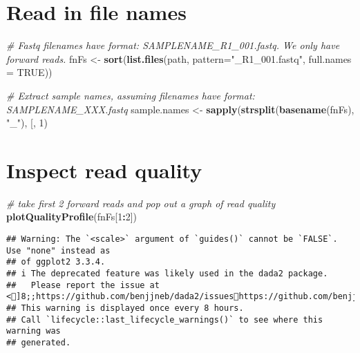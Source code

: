 \documentclass[
]{article}
\newenvironment{Shaded}{\begin{snugshade}}{\end{snugshade}}
\newcommand{\AttributeTok}[1]{\textcolor[rgb]{0.13,0.29,0.53}{#1}}
\newcommand{\CommentTok}[1]{\textcolor[rgb]{0.56,0.35,0.01}{\textit{#1}}}
\newcommand{\ConstantTok}[1]{\textcolor[rgb]{0.56,0.35,0.01}{#1}}
\newcommand{\DecValTok}[1]{\textcolor[rgb]{0.00,0.00,0.81}{#1}}
\newcommand{\FunctionTok}[1]{\textcolor[rgb]{0.13,0.29,0.53}{\textbf{#1}}}
\newcommand{\NormalTok}[1]{#1}
\newcommand{\OtherTok}[1]{\textcolor[rgb]{0.56,0.35,0.01}{#1}}
\newcommand{\SpecialCharTok}[1]{\textcolor[rgb]{0.81,0.36,0.00}{\textbf{#1}}}
\newcommand{\StringTok}[1]{\textcolor[rgb]{0.31,0.60,0.02}{#1}}
\begin{document}
\hypertarget{read-in-file-names}{%
\section{Read in file names}\label{read-in-file-names}}

\begin{Shaded}
\begin{Highlighting}[]
\CommentTok{\# Fastq filenames have format: SAMPLENAME\_R1\_001.fastq. We only have forward reads.}
\NormalTok{fnFs }\OtherTok{\textless{}{-}} \FunctionTok{sort}\NormalTok{(}\FunctionTok{list.files}\NormalTok{(path, }\AttributeTok{pattern=}\StringTok{"\_R1\_001.fastq"}\NormalTok{, }\AttributeTok{full.names =} \ConstantTok{TRUE}\NormalTok{))}

\CommentTok{\# Extract sample names, assuming filenames have format: SAMPLENAME\_XXX.fastq}
\NormalTok{sample.names }\OtherTok{\textless{}{-}} \FunctionTok{sapply}\NormalTok{(}\FunctionTok{strsplit}\NormalTok{(}\FunctionTok{basename}\NormalTok{(fnFs), }\StringTok{"\_"}\NormalTok{), }\StringTok{\textasciigrave{}}\AttributeTok{[}\StringTok{\textasciigrave{}}\NormalTok{, }\DecValTok{1}\NormalTok{)}
\end{Highlighting}
\end{Shaded}

\hypertarget{inspect-read-quality}{%
\section{Inspect read quality}\label{inspect-read-quality}}

\begin{Shaded}
\begin{Highlighting}[]
\CommentTok{\# take first 2 forward reads and pop out a graph of read quality}
\FunctionTok{plotQualityProfile}\NormalTok{(fnFs[}\DecValTok{1}\SpecialCharTok{:}\DecValTok{2}\NormalTok{])}
\end{Highlighting}
\end{Shaded}

\begin{verbatim}
## Warning: The `<scale>` argument of `guides()` cannot be `FALSE`. Use "none" instead as
## of ggplot2 3.3.4.
## i The deprecated feature was likely used in the dada2 package.
##   Please report the issue at <]8;;https://github.com/benjjneb/dada2/issueshttps://github.com/benjjneb/dada2/issues]8;;>.
## This warning is displayed once every 8 hours.
## Call `lifecycle::last_lifecycle_warnings()` to see where this warning was
## generated.
\end{verbatim}
\end{document}
